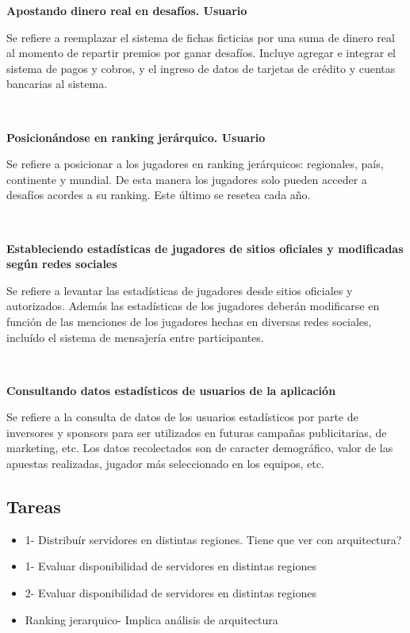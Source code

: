 \textbf{Apostando dinero real en desafíos. Usuario}

Se refiere a reemplazar el sistema de fichas ficticias por una suma de dinero real al momento de repartir premios por ganar desafíos.
Incluye agregar e integrar el sistema de pagos y cobros, y el ingreso de datos de tarjetas de crédito y cuentas bancarias al sistema.

~

\textbf{Posicionándose en ranking jerárquico. Usuario}

Se refiere a posicionar a los jugadores en ranking jerárquicos: regionales, país, continente y mundial.
De esta manera los jugadores solo pueden acceder a desafíos acordes a su ranking. Este último se resetea cada año.

~

\textbf{Estableciendo estadísticas de jugadores de sitios oficiales y modificadas según redes sociales}

Se refiere a levantar las estadísticas de jugadores desde sitios oficiales y autorizados. Además las estadísticas
de los jugadores deberán modificarse en función de las menciones de los jugadores hechas en diversas redes sociales,
incluído el sistema de mensajería entre participantes.

~

\textbf{Consultando datos estadísticos de usuarios de la aplicación}

Se refiere a la consulta de datos de los usuarios estadísticos por parte de inversores y sponsors para ser utilizados en futuras campañas publicitarias,
de marketing, etc. Los datos recolectados son de caracter demográfico, valor de las apuestas realizadas, jugador más seleccionado en los equipos, etc.

\subsection{Tareas}

\begin{itemize}
  \item 1- Distribuír servidores en distintas regiones. Tiene que ver con arquitectura?
  \item 1- Evaluar disponibilidad de servidores en distintas regiones
  \item 2- Evaluar disponibilidad de servidores en distintas regiones
  \item Ranking jerarquico- Implica análisis de arquitectura
\end{itemize}


